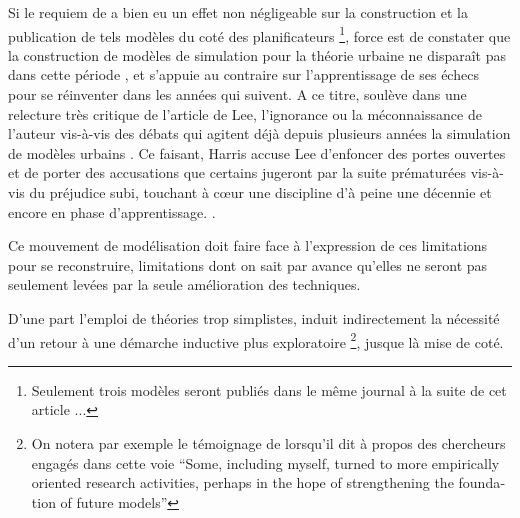 Si le requiem de \textcite{Lee1973} a bien eu un effet non négligeable sur la construction et la publication de tels modèles du coté des planificateurs \footnote{Seulement trois modèles seront publiés dans le même journal à la suite de cet article ...}, force est de constater que la construction de modèles de simulation pour la théorie urbaine ne disparaît pas dans cette période \autocite[11-12]{Batty1994}, et s'appuie au contraire sur l'apprentissage de ses échecs pour se réinventer dans les années qui suivent. A ce titre, \textcite{Harris1994} soulève dans une relecture très critique de l'article de Lee, l'ignorance ou la méconnaissance de l'auteur vis-à-vis des débats qui agitent déjà depuis plusieurs années la simulation de modèles urbains \autocites{Batty1971, Wilson1970, Orcutt1957, Harris1968}. Ce faisant, Harris accuse Lee d'enfoncer des portes ouvertes et de porter des accusations que certains jugeront par la suite prématurées vis-à-vis du préjudice subi, touchant à cœur une discipline d'à peine une décennie et encore en phase d'apprentissage. \autocite[p11]{Batty1994}.

Ce mouvement de modélisation doit faire face à l'expression de ces limitations pour se reconstruire, limitations dont on sait par avance qu'elles ne seront pas seulement levées par la seule amélioration des techniques.

D'une part l'emploi de théories trop simplistes, induit indirectement la nécessité d'un retour à une démarche inductive plus exploratoire \footnote{On notera par exemple le témoignage de \textcite{Boyce1988} lorsqu'il dit à propos des chercheurs engagés dans cette voie \foreignquote{english}{Some, including myself, turned to more empirically oriented research activities, perhaps in the hope of strengthening the foundation of future models}}, jusque là mise de coté.

